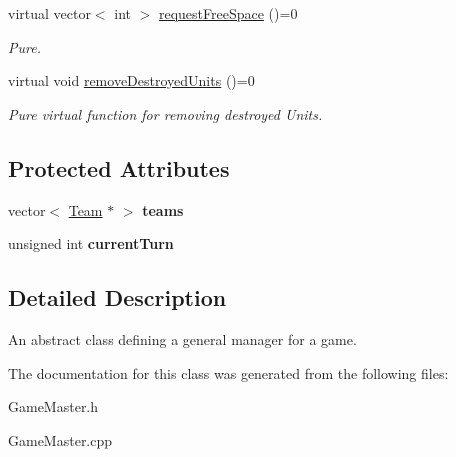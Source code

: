 \begin{DoxyCompactItemize}
\item 
\hypertarget{class_game_master_a58aea57e4aac40805bbd71d19e8da2ac}{}virtual vector$<$ int $>$ \hyperlink{class_game_master_a58aea57e4aac40805bbd71d19e8da2ac}{request\+Free\+Space} ()=0\label{class_game_master_a58aea57e4aac40805bbd71d19e8da2ac}

\begin{DoxyCompactList}\small\item\em Pure. \end{DoxyCompactList}\item 
\hypertarget{class_game_master_a324bec472bdb5e313e7b70d451b9eeae}{}virtual void \hyperlink{class_game_master_a324bec472bdb5e313e7b70d451b9eeae}{remove\+Destroyed\+Units} ()=0\label{class_game_master_a324bec472bdb5e313e7b70d451b9eeae}

\begin{DoxyCompactList}\small\item\em Pure virtual function for removing destroyed Units. \end{DoxyCompactList}\end{DoxyCompactItemize}
\subsection*{Protected Attributes}
\begin{DoxyCompactItemize}
\item 
\hypertarget{class_game_master_a7d6b8e0cace15fe5ad6eb0e2719b1f46}{}vector$<$ \hyperlink{class_team}{Team} $\ast$ $>$ {\bfseries teams}\label{class_game_master_a7d6b8e0cace15fe5ad6eb0e2719b1f46}

\item 
\hypertarget{class_game_master_aaf9704a5ebe858e028eac9dbb7e1325b}{}unsigned int {\bfseries current\+Turn}\label{class_game_master_aaf9704a5ebe858e028eac9dbb7e1325b}

\end{DoxyCompactItemize}


\subsection{Detailed Description}
An abstract class defining a general manager for a game. 

The documentation for this class was generated from the following files\+:\begin{DoxyCompactItemize}
\item 
Game\+Master.\+h\item 
Game\+Master.\+cpp\end{DoxyCompactItemize}
